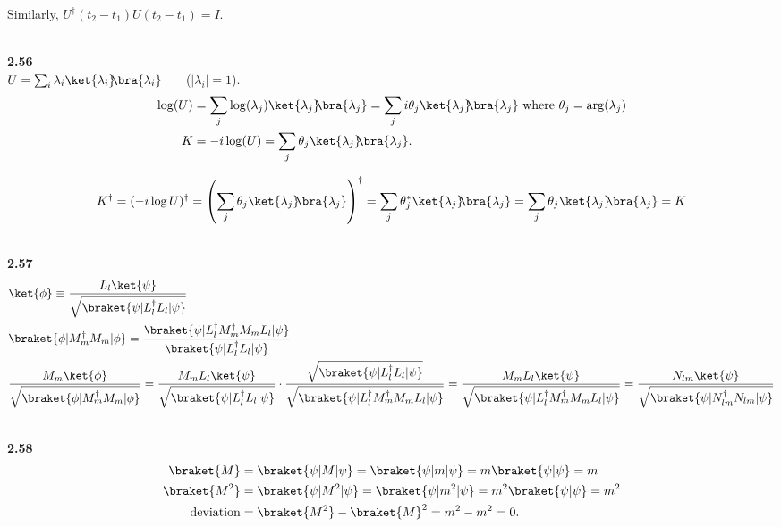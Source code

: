 \documentclass[10pt]{book}
\newcommand{\kb}[1]{\ket{#1}\hspace{-1mm} \bra{#1}} %
\newcommand{\Textbf}[1]{\hspace{3mm}\\ \textbf{#1}\\}
\begin{document}
	Similarly, $U^\dagger (t_2 - t_1) U (t_2 - t_1) = I$.
	
	
	
	\Textbf{2.56}
	
	$U = \sum_i \lambda_i \kb{\lambda_i}$~~~ ($|\lambda_i| = 1$).
	\begin{equation}
\begin{aligned}
		\log (U) &= \sum_j \log (\lambda_j) \kb{\lambda_j} = \sum_j i \theta_j  \kb{\lambda_j} \text{ where } \theta_j = \arg (\lambda_j)\\
		K &= - i \log(U) = \sum_j \theta_j \kb{\lambda_j}.
	\end{aligned}
\end{equation}
	
	\begin{equation}
\begin{aligned}
		K^\dagger = (-i \log U)^\dagger = \left(\sum_j \theta_j \kb{\lambda_j}\right)^\dagger
		= \sum_j \theta_j^* \kb{\lambda_j} = \sum_j \theta_j \kb{\lambda_j} = K
	\end{aligned}
\end{equation}
	
	
	
	\Textbf{2.57}
	\begin{equation}
\begin{aligned}
		&\ket{\phi} \equiv \frac{L_l \ket{\psi}}{\sqrt{\braket{\psi |L_l^\dagger L_l | \psi}}}\\
		&\braket{\phi | M_m^\dagger M_m | \phi} = \frac{\braket{\psi | L_l^\dagger M_m^\dagger M_m L_l | \psi}}{\braket{\psi | L_l^\dagger L_l | \psi}} \\
		&\frac{M_m \ket{\phi}}{\sqrt{\braket{\phi | M_m^\dagger M_m | \phi}}} =
		\frac{M_m L_l \ket{\psi}}{\sqrt{\braket{\psi |L_l^\dagger L_l | \psi}}}
		\cdot
		\frac{ \sqrt{\braket{\psi | L_l^\dagger L_l | \psi}} }{ \sqrt{\braket{\psi | L_l^\dagger M_m^\dagger M_m L_l | \psi}} }
		=
		\frac{M_m L_l \ket{\psi}}{ \sqrt{\braket{\psi | L_l^\dagger M_m^\dagger M_m L_l | \psi}} }
		=
		\frac{N_{lm} \ket{\psi}}{\sqrt{\braket{\psi |N^\dagger_{lm}  N_{lm}  | \psi}}}
	\end{aligned}
\end{equation}
	
	
	
	\Textbf{2.58}
	\begin{equation}
\begin{aligned}
		\braket{M} &= \braket{ \psi | M | \psi} = \braket{\psi | m | \psi} = m \braket{\psi | \psi} = m\\
		\braket{M^2} &= \braket{ \psi | M^2 | \psi} = \braket{\psi | m^2 | \psi} = m^2 \braket{\psi | \psi} = m^2\\
		\text{deviation} &= \braket{M^2} - \braket{M}^2 = m^2 - m^2 = 0.
	\end{aligned}
\end{equation}
	
\end{document}
